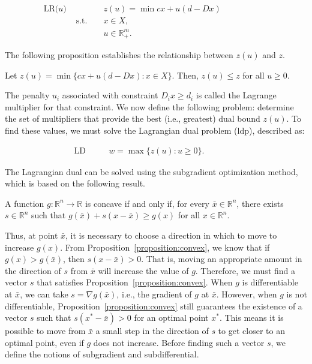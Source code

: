 \begin{align*}
	\text{LR($u$) } &              &  & z(u) = \min cx + u(d - Dx) &  &  &  &  &  &  &   \\
	                & \text{s.t. } &  & x \in X,                   &  &  &  &  &  &  &   \\
	                &              &  & u \in \mathbb{R}^m_+.      &  &  &  &  &  &  & 
\end{align*}

The following proposition establishes the relationship between $z(u)$ and $z$.

\begin{proposition}
	Let $z(u) = \min \{cx + u (d - Dx) : x \in X\}$. Then, $z(u) \leq z$ for all $u \geq 0$.
\end{proposition}

The penalty $u_i$ associated with constraint $D_ix \geq d_i$ is called the
Lagrange multiplier for that constraint. We now define the following problem:
determine the set of multipliers that provide the best (i.e., greatest) dual
bound $z(u)$. To find these values, we must solve the Lagrangian dual problem
(\gls{ldp}), described as:

\begin{align*}
	\text{LD } &  &  & w = \max \{z(u) : u \geq 0\}. &  &  &  &  & 
\end{align*}

The Lagrangian dual can be solved using the subgradient optimization method,
which is based on the following result.

\begin{proposition} \label{proposition:convex}
	A function $g : \mathbb{R}^n \rightarrow \mathbb{R}$ is concave if and only if, for every $\bar{x} \in \mathbb{R}^n$, there exists $s \in \mathbb{R}^n$ such that $g(\bar{x}) + s(x - \bar{x}) \geq g(x)$ for all $x \in \mathbb{R}^n$.
\end{proposition}

Thus, at point $\bar{x}$, it is necessary to choose a direction in which to move
to increase $g(x)$. From Proposition~\ref{proposition:convex}, we know that if
$g(x) > g(\bar{x})$, then $s(x - \bar{x}) > 0$. That is, moving an appropriate
amount in the direction of $s$ from $\bar{x}$ will increase the value of $g$.
Therefore, we must find a vector $s$ that satisfies
Proposition~\ref{proposition:convex}. When $g$ is differentiable at $\bar{x}$,
we can take $s = \nabla g(\bar{x})$, i.e., the gradient of $g$ at $\bar{x}$.
However, when $g$ is not differentiable, Proposition~\ref{proposition:convex}
still guarantees the existence of a vector $s$ such that $s(x^* - \bar{x}) > 0$
for an optimal point $x^*$. This means it is possible to move from $\bar{x}$ a
small step in the direction of $s$ to get closer to an optimal point, even if
$g$ does not increase. Before finding such a vector $s$, we define the notions
of subgradient and subdifferential.

